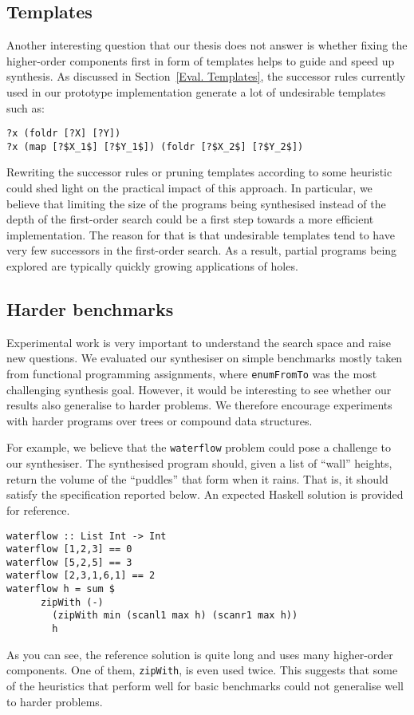 \subsection{Templates}
Another interesting question that our thesis does not answer is whether fixing the higher-order components first in form of templates helps to guide and speed up synthesis. As discussed in Section~\ref{Eval. Templates}, the successor rules currently used in our prototype implementation generate a lot of undesirable templates such as:
\begin{lstlisting}[style=plain]
?x (foldr [?X] [?Y])
?x (map [?$X_1$] [?$Y_1$]) (foldr [?$X_2$] [?$Y_2$])
\end{lstlisting}
Rewriting the successor rules or pruning templates according to some heuristic could shed light on the practical impact of this approach. In particular, we believe that limiting the size of the programs being synthesised instead of the depth of the first-order search could be a first step towards a more efficient implementation. The reason for that is that undesirable templates tend to have very few successors in the first-order search. As a result, partial programs being explored are typically quickly growing applications of holes.

\subsection{Harder benchmarks}

Experimental work is very important to understand the search space and raise new questions. We evaluated our synthesiser on simple benchmarks mostly taken from functional programming assignments, where \lstinline!enumFromTo! was the most challenging synthesis goal. However, it would be interesting to see whether our results also generalise to harder problems. We therefore encourage experiments with harder programs over trees or compound data structures.

For example, we believe that the \lstinline!waterflow! problem could pose a challenge to our synthesiser. The synthesised program should, given a list of ``wall'' heights, return the volume of the ``puddles'' that form when it rains. That is, it should satisfy the specification reported below. An expected Haskell solution is provided for reference.
\begin{lstlisting}[mathescape=false]
waterflow :: List Int -> Int
waterflow [1,2,3] == 0
waterflow [5,2,5] == 3
waterflow [2,3,1,6,1] == 2
waterflow h = sum $ 
      zipWith (-) 
        (zipWith min (scanl1 max h) (scanr1 max h))
        h
\end{lstlisting}
As you can see, the reference solution is quite long and uses many higher-order components. One of them, \lstinline!zipWith!, is even used twice. This suggests that some of the heuristics that perform well for basic benchmarks could not generalise well to harder problems.







